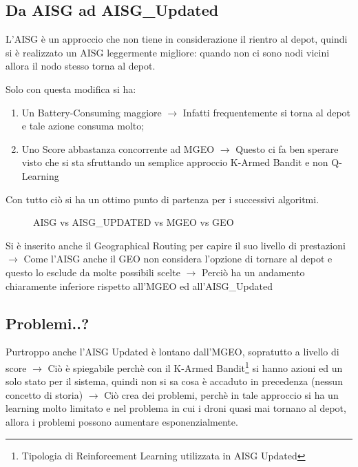 \documentclass[12pt]{article}
\begin{document}
\subsection{Da AISG ad AISG\_Updated}

L'AISG è un approccio che non tiene in considerazione il rientro al depot, quindi si è realizzato un AISG leggermente migliore: quando non ci sono nodi vicini allora il nodo stesso torna al depot.

Solo con questa modifica si ha:

\begin{enumerate}
    \item Un Battery-Consuming maggiore $\rightarrow$ Infatti frequentemente si torna al depot e tale azione consuma molto;
    
    \item Uno Score abbastanza concorrente ad MGEO $\rightarrow$ Questo ci fa ben sperare visto che si sta sfruttando un semplice approccio K-Armed Bandit e non Q-Learning
\end{enumerate}

Con tutto ciò si ha un ottimo punto di partenza per i successivi algoritmi.

\begin{figure}[H]
    
    \qquad
    \caption{AISG vs AISG\_UPDATED vs MGEO vs GEO}%
    \label{fig:example}%
\end{figure}

Si è inserito anche il Geographical Routing per capire il suo livello di prestazioni $\rightarrow$ Come l'AISG anche il GEO non considera l'opzione di tornare al depot e questo lo esclude da molte possibili scelte $\rightarrow$ Perciò ha un andamento chiaramente inferiore rispetto all'MGEO ed all'AISG\_Updated

\subsection{Problemi..?}

Purtroppo anche l'AISG Updated è lontano dall'MGEO, sopratutto a livello di score $\rightarrow$ Ciò è spiegabile perchè con il K-Armed Bandit\footnote{Tipologia di Reinforcement Learning utilizzata in AISG Updated} si hanno azioni ed un solo stato per il sistema, quindi non si sa cosa è accaduto in precedenza (nessun concetto di storia) $\rightarrow$ Ciò crea dei problemi, perchè in tale approccio si ha un learning molto limitato e nel problema in cui i droni quasi mai tornano al depot, allora i problemi possono aumentare esponenzialmente.
 
\end{document}
